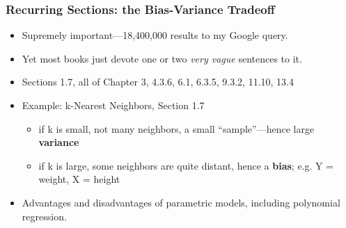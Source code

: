 \documentclass{beamer}
\begin{document}
\begin{frame} 
\frametitle{Recurring Sections: the Bias-Variance Tradeoff}%

\begin{itemize}

\item Supremely important---18,400,000 results to my Google query.

\item Yet most books just devote one or two \textit{very vague}
sentences to it.

\item Sections 1.7, all of Chapter 3, 4.3.6, 6.1, 6.3.5, 9.3.2, 11.10, 13.4

\item Example: k-Nearest Neighbors, Section 1.7

\begin{itemize}

\item if k is small, not many neighbors, a small ``sample''---hence large
\textbf{variance} 

\item if k is large, some neighbors are quite distant,
hence a \textbf{bias}; e.g. Y = weight, X = height

\end{itemize} 

\item Advantages and disadvantages of parametric models, including
polynomial regression.

\end{itemize} 

\end{frame} 
\end{document}
